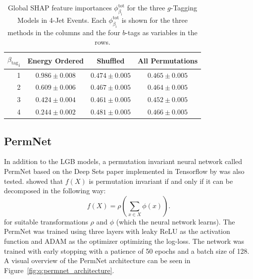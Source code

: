 \begin{table}[]
  \centerfloat
  \begin{tabular}{@{}rccc@{}}
  ${\beta_\mathrm{tag}}_i$  & Energy Ordered & Shuffled & All Permutations \\ \midrule
  1 & $ 0.986 \pm 0.008 $  &  $ 0.474 \pm 0.005 $  &  $ 0.465 \pm 0.005 $  \\
  2 & $ 0.609 \pm 0.006 $  &  $ 0.467 \pm 0.005 $  &  $ 0.464 \pm 0.005 $  \\
  3 & $ 0.424 \pm 0.004 $  &  $ 0.461 \pm 0.005 $  &  $ 0.452 \pm 0.005 $  \\
  4 & $ 0.244 \pm 0.002 $  &  $ 0.481 \pm 0.005 $  &  $ 0.466 \pm 0.005 $  \\ 
  \end{tabular}
  \caption[Global SHAP Feature Importances for the $g$-Tagging Models in 4-Jet Events]{Global SHAP feature importances $\phi^\mathrm{tot}_{\beta_\mathrm{i}}$ for the three $g$-Tagging Models in 4-Jet Events. Each $\phi^\mathrm{tot}_{\beta_\mathrm{i}}$ is shown for the three methods in the columns and the four $b$-tags as variables in the rows.}
  \label{table:q:shap_g_taggging_global_4j}
\end{table}


\subsection{PermNet}
\label{subsec:q:permnet}

In addition to the LGB models, a permutation invariant neural network called PermNet based on the Deep Sets paper \autocite{zaheerDeepSets2017} implemented in Tensorflow \citep{tensorflow2015-whitepaper} by \citet{fayeFrederikFayeDeepcalo} was also tested. \citet{zaheerDeepSets2017} showed that $f(X)$ is permutation invariant if and only if it can be decomposed in the following way:
\begin{equation}
  \label{eq:q:deep_sets}
  f(X)=\rho\left(\sum_{x\in X} \phi(x) \right).
\end{equation}
for suitable transformations $\rho$ and $\phi$ (which the neural network learns). The PermNet was trained using three layers with leaky ReLU \autocite{Maas2013RectifierNI} as the activation function and ADAM \autocite{kingmaAdamMethodStochastic2014} as the optimizer optimizing the log-loss. The network was trained with early stopping with a patience of \num{50} epochs and a batch size of \num{128}. A visual overview of the PermNet architecture can be seen in Figure~\ref{fig:q:permnet_architecture}.

